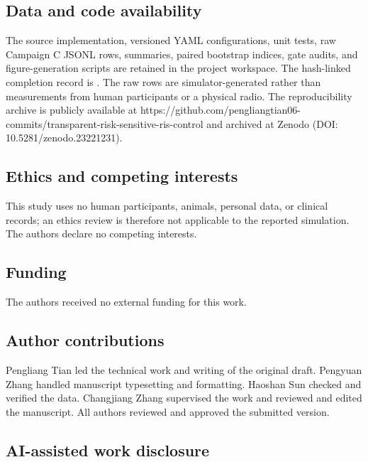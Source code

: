 \documentclass[10pt,twocolumn]{article}
\begin{document}
\subsection*{Data and code availability}\label{data-and-code-availability}

The source implementation, versioned YAML configurations, unit tests,
raw Campaign C JSONL rows, summaries, paired bootstrap indices, gate
audits, and figure-generation scripts are retained in the project
workspace. The hash-linked completion record is
.
The raw rows are simulator-generated rather than measurements from human
participants or a physical radio. The reproducibility archive is
publicly available at
https://github.com/pengliangtian06-commits/transparent-risk-sensitive-ris-control
and archived at Zenodo (DOI: 10.5281/zenodo.23221231).

\subsection*{Ethics and competing interests}\label{ethics-and-competing-interests}

This study uses no human participants, animals, personal data, or
clinical records; an ethics review is therefore not applicable to the
reported simulation. The authors declare no competing interests.

\subsection*{Funding}\label{funding}

The authors received no external funding for this work.

\subsection*{Author contributions}\label{author-contributions}

Pengliang Tian led the technical work and writing of the original draft.
Pengyuan Zhang handled manuscript typesetting and formatting. Haoshan
Sun checked and verified the data. Changjiang Zhang supervised the work
and reviewed and edited the manuscript. All authors reviewed and
approved the submitted version.

\subsection*{AI-assisted work disclosure}\label{ai-assisted-work-disclosure}
\end{document}
